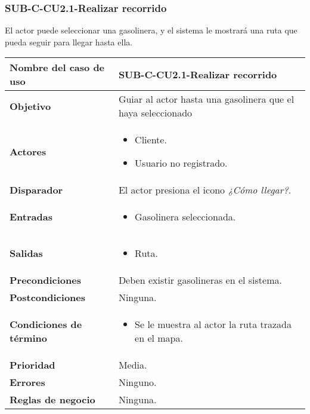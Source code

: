 \subsubsection{SUB-C-CU2.1-Realizar recorrido}\label{SUB-C-CU2.1}
El actor puede seleccionar una gasolinera, y el sistema le mostrará una ruta que pueda seguir para llegar hasta ella.

\begin{longtable}{|J{5cm}|J{10.3cm}|}
	\hline
	\textbf{Nombre del caso de uso} &
		SUB-C-CU2.1-Realizar recorrido \\ \hline
	\textbf{Objetivo} &
		Guiar al actor hasta una gasolinera que el haya seleccionado \\ \hline
	\textbf{Actores} &
		\begin{itemize}
			\item Cliente.
			\item Usuario no registrado.
		\end{itemize}
		 \\ \hline 
	\textbf{Disparador} & 
		El actor presiona el icono \textit{¿Cómo llegar?}. \\ \hline 
	\textbf{Entradas} & 
		\begin{itemize}
				\item Gasolinera seleccionada.
		\end{itemize}\\ \hline 
	\textbf{Salidas} & 
		\begin{itemize}
			\item Ruta.
		\end{itemize} \\ \hline
	\textbf{Precondiciones} &
		Deben existir gasolineras en el sistema.\\ \hline
	\textbf{Postcondiciones} & Ninguna.
		\\ \hline
	\textbf{Condiciones de término} & 
		\begin{itemize}
			\item Se le muestra al actor la ruta trazada en el mapa.
		\end{itemize} \\ \hline 
	\textbf{Prioridad} & 
		Media. \\ \hline
	\textbf{Errores} & Ninguno.
		\\ \hline
	\textbf{Reglas de negocio} & Ninguna.
		 \\ \hline
\end{longtable}

